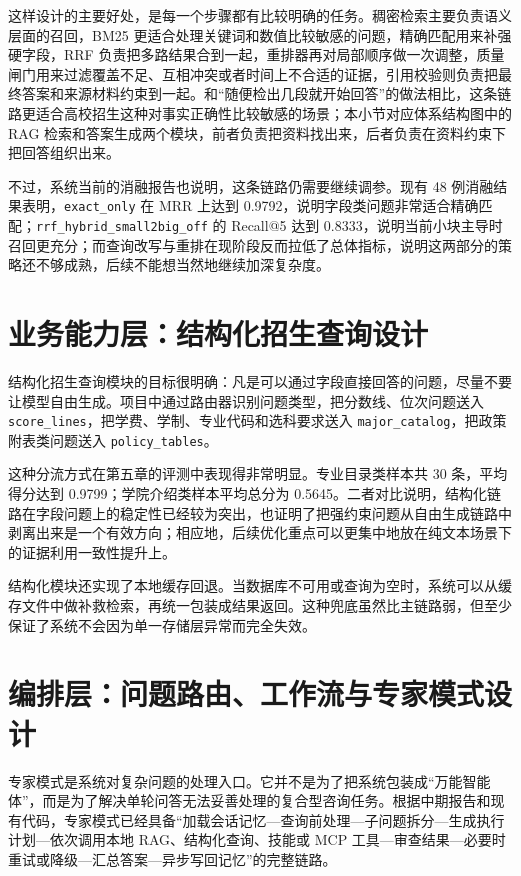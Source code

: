 \documentclass[UTF8,zihao=-4,oneside]{ctexbook}
\numberwithin{equation}{chapter}
\begin{document}
这样设计的主要好处，是每一个步骤都有比较明确的任务。稠密检索主要负责语义层面的召回，BM25 更适合处理关键词和数值比较敏感的问题，精确匹配用来补强硬字段，RRF 负责把多路结果合到一起，重排器再对局部顺序做一次调整，质量闸门用来过滤覆盖不足、互相冲突或者时间上不合适的证据，引用校验则负责把最终答案和来源材料约束到一起。和“随便检出几段就开始回答”的做法相比，这条链路更适合高校招生这种对事实正确性比较敏感的场景；本小节对应体系结构图中的 RAG 检索和答案生成两个模块，前者负责把资料找出来，后者负责在资料约束下把回答组织出来。

不过，系统当前的消融报告也说明，这条链路仍需要继续调参。现有 48 例消融结果表明，\texttt{exact\_only} 在 MRR 上达到 0.9792，说明字段类问题非常适合精确匹配；\texttt{rrf\_hybrid\_small2big\_off} 的 Recall@5 达到 0.8333，说明当前小块主导时召回更充分；而查询改写与重排在现阶段反而拉低了总体指标，说明这两部分的策略还不够成熟，后续不能想当然地继续加深复杂度。

\section{业务能力层：结构化招生查询设计}
结构化招生查询模块的目标很明确：凡是可以通过字段直接回答的问题，尽量不要让模型自由生成。项目中通过路由器识别问题类型，把分数线、位次问题送入 \texttt{score\_lines}，把学费、学制、专业代码和选科要求送入 \texttt{major\_catalog}，把政策附表类问题送入 \texttt{policy\_tables}\cite{projectanalysis}。

这种分流方式在第五章的评测中表现得非常明显。专业目录类样本共 30 条，平均得分达到 0.9799；学院介绍类样本平均总分为 0.5645。二者对比说明，结构化链路在字段问题上的稳定性已经较为突出，也证明了把强约束问题从自由生成链路中剥离出来是一个有效方向；相应地，后续优化重点可以更集中地放在纯文本场景下的证据利用一致性提升上。

结构化模块还实现了本地缓存回退。当数据库不可用或查询为空时，系统可以从缓存文件中做补救检索，再统一包装成结果返回。这种兜底虽然比主链路弱，但至少保证了系统不会因为单一存储层异常而完全失效。

\section{编排层：问题路由、工作流与专家模式设计}
专家模式是系统对复杂问题的处理入口。它并不是为了把系统包装成“万能智能体”，而是为了解决单轮问答无法妥善处理的复合型咨询任务。根据中期报告和现有代码，专家模式已经具备“加载会话记忆—查询前处理—子问题拆分—生成执行计划—依次调用本地 RAG、结构化查询、技能或 MCP 工具—审查结果—必要时重试或降级—汇总答案—异步写回记忆”的完整链路\cite{projectanalysis}。
\end{document}
